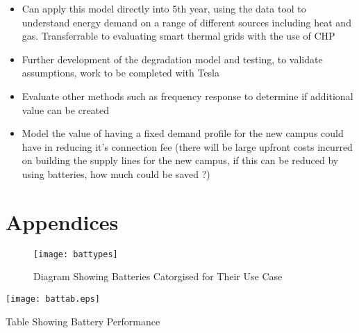 \begin{itemize}
\tightlist
\item
  Can apply this model directly into 5th year, using the data tool to
  understand energy demand on a range of different sources including
  heat and gas. Transferrable to evaluating smart thermal grids with the
  use of CHP
\item
  Further development of the degradation model and testing, to validate
  assumptions, work to be completed with Tesla
\item
  Evaluate other methods such as frequency response to determine if
  additional value can be created
\item
  Model the value of having a fixed demand profile for the new campus
  could have in reducing it's connection fee (there will be large
  upfront costs incurred on building the supply lines for the new
  campus, if this can be reduced by using batteries, how much could be
  saved ?)
\end{itemize}

\newpage

\section{Appendices}

\begin{figure}[H]
\centering
\texttt{[image: battypes]}
\caption{Diagram Showing Batteries Catorgised for Their Use Case \cite{Dunn928}}
\label{battypes}
\end{figure}

\begin{landscape}

\begin{table}[H]
\centering
\texttt{[image: battab.eps]}
\caption{Table Showing Battery Performance}
\label{battabs}
\end{table}

\end{landscape}
